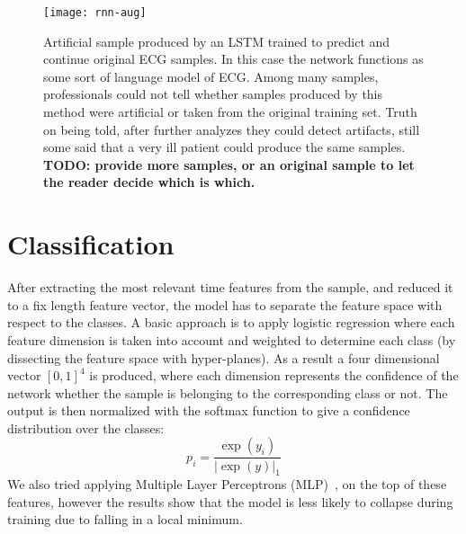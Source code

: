 \begin{figure}
  \centering
  \texttt{[image: rnn-aug]}\label{fig:rnn-aug}
  \caption{Artificial sample produced by an LSTM trained to predict and continue original ECG samples. In this case the network functions as some sort of language model of ECG. Among many samples, professionals could not tell whether samples produced by this method were artificial or taken from the original training set. Truth on being told, after further analyzes they could detect artifacts, still some said that a very ill patient could produce the same samples. \textbf{TODO: provide more samples, or an original sample to let the reader decide which is which.}}
\end{figure}

\section{Classification}
After extracting the most relevant time features from the sample, and reduced it to a fix length feature vector, the model has to separate the feature space with respect to the classes.
A basic approach is to apply logistic regression where each feature dimension is taken into account and weighted to determine each class (by dissecting the feature space with hyper-planes).
As a result a four dimensional vector $[0, 1]^4$ is produced, where each dimension represents the confidence of the network whether the sample is belonging to the corresponding class or not. The output is then normalized with the softmax function to give a confidence distribution over the classes:
\begin{equation}
p_i = \frac{\exp(y_i)}{|\exp(y)|_1}
\end{equation}
We also tried applying Multiple Layer Perceptrons (MLP)~\cite{girshick2014rich}, on the top of these features, however the results show that the model is less likely to collapse during training due to falling in a local minimum.
